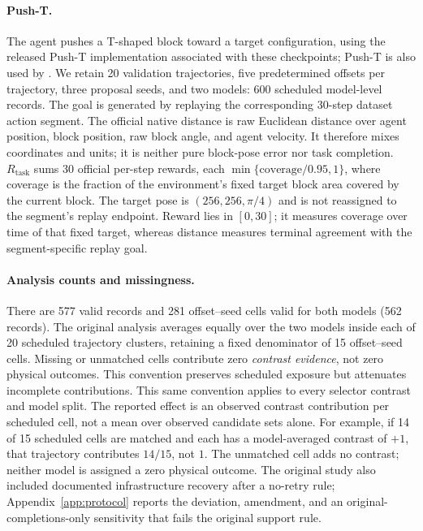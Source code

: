 \documentclass{article}
\begin{document}
\paragraph{Push-T.}
The agent pushes a T-shaped block toward a target configuration, using the
released Push-T implementation associated with these checkpoints; Push-T is
also used by \citet{chi2023diffusionpolicy}. We retain 20 validation trajectories,
five predetermined offsets per trajectory, three proposal seeds, and two
models: 600 scheduled model-level records. The goal is generated by replaying
the corresponding 30-step dataset action segment. The official native distance
is raw Euclidean distance over agent position, block position, raw block angle,
and agent velocity. It therefore mixes coordinates and units; it is neither
pure block-pose error nor task completion. $R_{\mathrm{task}}$ sums 30
official per-step rewards, each $\min\{\mathrm{coverage}/0.95,1\}$, where
coverage is the fraction of the environment's fixed target block area covered
by the current block. The target pose is $(256,256,\pi/4)$ and is not reassigned
to the segment's replay endpoint. Reward lies in $[0,30]$; it measures coverage
over time of that fixed target, whereas distance measures terminal agreement
with the segment-specific replay goal.

\paragraph{Analysis counts and missingness.}
There are 577 valid records and 281 offset--seed cells valid for both models
(562 records). The original analysis averages equally over the two models
inside each of 20 scheduled trajectory clusters, retaining a fixed denominator
of 15 offset--seed cells. Missing or unmatched cells contribute zero
\emph{contrast evidence}, not zero physical outcomes. This convention preserves
scheduled exposure but attenuates incomplete contributions. This same
convention applies to every selector contrast and model split. The reported
effect is an observed contrast contribution per scheduled cell, not a mean over
observed candidate sets alone. For example, if 14 of 15 scheduled cells are
matched and each has a model-averaged contrast of $+1$, that trajectory
contributes $14/15$, not $1$. The unmatched cell adds no contrast; neither
model is assigned a zero physical outcome.
The original study also included documented infrastructure recovery after a no-retry rule;
Appendix~\ref{app:protocol} reports the deviation, amendment, and an
original-completions-only sensitivity that fails the original support rule.
\end{document}
